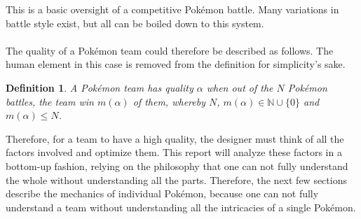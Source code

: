 \documentclass{article}
\newtheorem{definition}{Definition}
\begin{document}
This is a basic oversight of a competitive Pok\'emon battle. Many variations in battle style exist, but all can be boiled down to this system.\\\\
The quality of a Pok\'emon team could therefore be described as follows. The human element in this case is removed from the definition for simplicity's sake.
\begin{definition}
	A Pok\'emon team has quality $\alpha$ when out of the $N$ Pok\'emon battles, the team win $m(\alpha)$ of them, whereby $N$, $m(\alpha)\in\mathbb{N}\cup\{0\}$ and $m(\alpha)\le N$.
\end{definition}
Therefore, for a team to have a high quality, the designer must think of all the factors involved and optimize them. This report will analyze these factors in a bottom-up fashion, relying on the philosophy that one can not fully understand the whole without understanding all the parts. Therefore, the next few sections describe the mechanics of individual Pok\'emon, because one can not fully understand a team without understanding all the intricacies of a single Pok\'emon.
\end{document}

